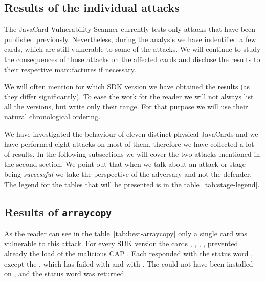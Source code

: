 \documentclass{../llncs/llncs}
\begin{document}

    \subsection{Results of the individual attacks}

        The JavaCard Vulnerability Scanner currently tests only attacks that have been published previously. Nevertheless, during the analysis we have indentified a few cards, which are still vulnerable to some of the attacks. We will continue to study the consequences of those attacks on the affected cards and disclose the results to their respective manufactures if necessary.

        We will often mention for which SDK version we have obtained the results (as they differ significantly). To ease the work for the reader we will not always list all the versions, but write only their range. For that purpose we will use their natural chronological ordering.

        We have investigated the behaviour of eleven distinct physical JavaCards and we have performed eight attacks on most of them, therefore we have collected a lot of results. In the following subsections we will cover the two attacks mentioned in the second section. We point out that when we talk about an attack or stage being \textit{successful} we take the perspective of the adversary and not the defender. The legend for the tables that will be presented is in the table~\ref{tab:stage-legend}.

\setlength{\tabcolsep}{.5pt}
\renewcommand{\arraystretch}{.20}
\setlength{\floatsep}{0pt}

\begin{table}[htb]
    \captionsetup{font=footnotesize}
    \parbox[b][][b]{.45\linewidth}{
        
    }
    \hfill
    \parbox[b][][b]{.45\linewidth}{
        
    }
\end{table}

\subsection{Results of \texttt{arraycopy}}\label{subsec:result-arraycopy}
            As the reader can see in the table~\ref{tab:best-arraycopy} only a single card was vulnerable to this attack. For every SDK version the cards \Cnewcard, \Fcard, \Gcard, \Hcard, \Inewcard prevented already the load of the malicious CAP \vulnscap. Each responded with the status word \swwrongdata, except the \Cnewcard, which has failed with \swunknown and \Inewcard with \swwrongdata. The \vulnscap could not have been installed on \Icard, \Ccard and the status word \swconditionsnotsatisfied was returned.
\end{document}
